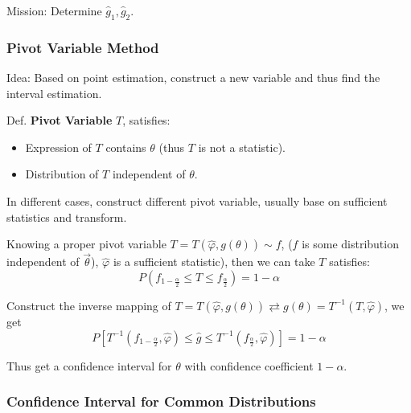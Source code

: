 \documentclass[11pt,a4paper]{ctexart}
\numberwithin{equation}{section}%
\begin{document}
    Mission: Determine $\hat{g}_1,\hat{g}_2$.


\subsubsection{Pivot Variable Method}\label{SubSectionPivotVariableMethod}
    Idea: Based on point estimation, construct a new variable and thus find the interval estimation.

    Def. \textbf{Pivot Variable} $T$, satisfies: 
    \begin{itemize}[itemsep= -5 pt,parsep= 0 pt]
        \item Expression of $T$ contains $\theta$ (thus $T$ is not a statistic).
        \item Distribution of $T$ independent of $\theta$.
    \end{itemize}

    In different cases, construct different pivot variable, usually base on sufficient statistics and transform.
    
    Knowing a proper pivot variable $T=T(\hat{\varphi},g(\theta))\sim f$, ($f$ is some distribution independent of $\vec{\theta}$), $\hat{\varphi}$ is a sufficient statistic), then we can take $T$ satisfies:
    \[
        P(f_{1-\frac{\alpha}{2}}\leq T\leq f_{\frac{\alpha}{2}})=1-\alpha
    \]

    Construct the inverse mapping of $T=T(\hat{\varphi},g(\theta))\rightleftarrows g(\theta)=T^{-1}(T,\hat{\varphi})$, we get
    \[
        P[T^{-1}(f_{1-\frac{\alpha}{2}},\hat{\varphi})\leq\hat{g}\leq T^{-1}(f_{\frac{\alpha}{2}},\hat{\varphi})]=1-\alpha
    \]
    
    Thus get a confidence interval for $\theta$ with confidence coefficient $1-\alpha$.\\



\subsubsection{Confidence Interval for Common Distributions}\label{SubSectionConfidenceIntervalForDistributions}
\end{document}

